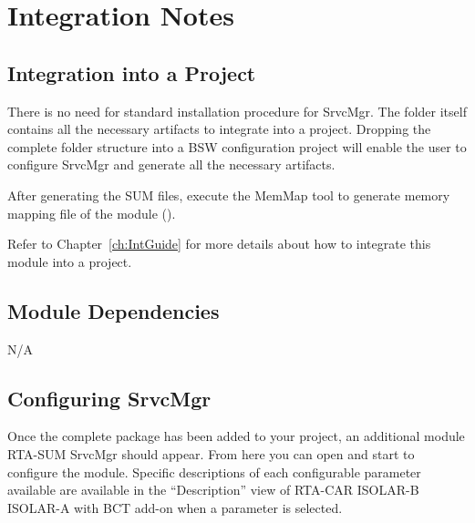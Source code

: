 \chapter{Integration Notes}

\section{Integration into a Project}
\ifnum {}
\else
{
There is no need for standard installation procedure for SrvcMgr. The folder itself contains all the necessary
artifacts to integrate into a project. Dropping the complete folder structure into a BSW configuration
project will enable the user to configure SrvcMgr and generate all the necessary artifacts.

After generating the SUM files, execute the MemMap tool to generate memory mapping file of the module ().
}
\fi

Refer to Chapter~\ref {ch:IntGuide}
for more details about how to integrate this module into a project.

\section{Module Dependencies}
\label{sec:dependencies}
N/A

\section{Configuring SrvcMgr}
Once the complete package has been added to your project, an additional module RTA-SUM SrvcMgr should appear.
From here you can open and start to configure the module.
Specific descriptions of each configurable parameter available are available in the “Description” view of 
\ifnum {}
{
RTA-CAR ISOLAR-B
}
\else
{
ISOLAR-A with BCT add-on 
}\fi when a parameter is selected.

